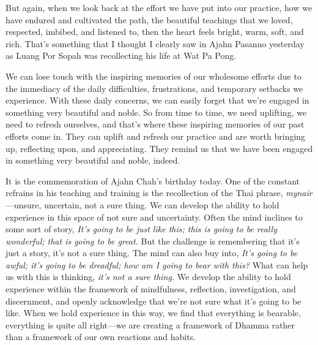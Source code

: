 But again, when we look back at the effort we have put into our 
practice, how we have endured and cultivated the path, the beautiful 
teachings that we loved, respected, imbibed, and listened to, then the 
heart feels bright, warm, soft, and rich. That's something that I 
thought I clearly saw in Ajahn Pasanno yesterday as Luang Por Sopah was 
recollecting his life at Wat Pa Pong.

We can lose touch with the inspiring memories of our wholesome efforts 
due to the immediacy of the daily difficulties, frustrations, and 
temporary setbacks we experience. With these daily concerns, we can 
easily forget that we're engaged in something very beautiful and noble. 
So from time to time, we need uplifting, we need to refresh ourselves, 
and that's where these inspiring memories of our past efforts come in. 
They can uplift and refresh our practice and are worth bringing up, 
reflecting upon, and appreciating. They remind us that we have been 
engaged in something very beautiful and noble, indeed.


It is the commemoration of Ajahn Chah's birthday today. One of the 
constant refrains in his teaching and training is the recollection of 
the Thai phrase, \emph{mynair}---unsure, uncertain, not a sure thing. 
We can develop the ability to hold experience in this space of not sure 
and uncertainty. Often the mind inclines to some sort of story, 
\emph{It's going to be just like this; this is going to be really 
wonderful; that is going to be great.} But the challenge is remembering 
that it's just a story, it's not a sure thing. The mind can also buy 
into, \emph{It's going to be awful; it's going to be dreadful; how am I 
going to bear with this?} What can help us with this is thinking, 
\emph{it's not a sure thing.} We develop the ability to hold experience 
within the framework of mindfulness, reflection, investigation, and 
discernment, and openly acknowledge that we're not sure what it's going 
to be like. When we hold experience in this way, we find that 
everything is bearable, everything is quite all right---we are creating 
a framework of Dhamma rather than a framework of our own reactions and 
habits.


